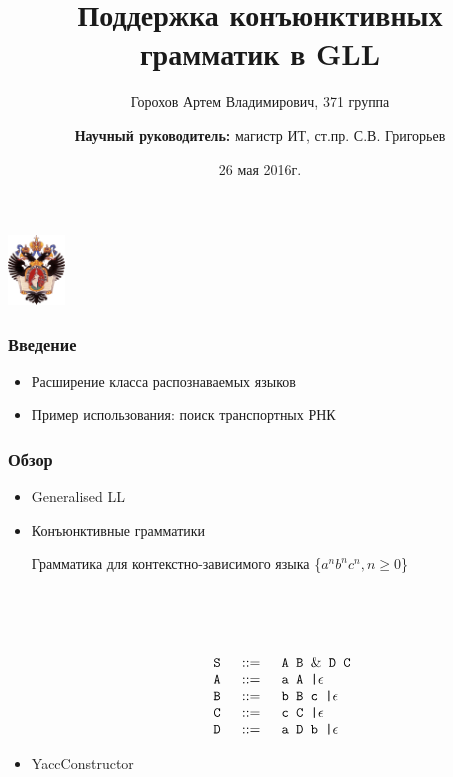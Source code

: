 \documentclass{beamer}
\title[]{Поддержка конъюнктивных грамматик в GLL}
\institute[СПбГУ]{
Санкт-Петербургский государственный университет \\
Кафедра системного программирования }
\author[Горохов Артем]{Горохов Артем Владимирович, 371 группа \\
  \and  
    {\bfseries Научный руководитель:} магистр ИТ, ст.пр. С.В. Григорьев}
\date{26 мая 2016г.}
\begin{document}
{
\begin{frame}
  \begin{center}
  {\includegraphics[width=1.5cm]{courseworkpictures/SPbGU_Logo.png}}
  \end{center}
  \titlepage
\end{frame}
}

\begin{frame}[fragile]
  \transwipe[direction=90]
  \frametitle{Введение}
  \begin{itemize}
    \item Расширение класса распознаваемых языков 
    \item Пример использования: поиск транспортных РНК
  \end{itemize}
\end{frame}
            
\begin{frame}
  \transwipe[direction=90]
  \frametitle{Обзор}
  \begin{itemize}
    \item Generalised LL
    \item Конъюнктивные грамматики \\
        \centerline{Грамматика для контекстно-зависимого языка \{$a^n b^n c^n, n \geq 0$\}} \\
        \\
        \vspace{-10pt}
        \\
        $$
        \begin{array}{crcl}
        & \mbox{\texttt{ S }} &::=& \mbox{\texttt{ A B }} \& \mbox{\texttt{ D C}} \\
        & \mbox{\texttt{ A }} & ::=& \mbox{\texttt{ a A |}}  \epsilon \\
        & \mbox{\texttt{ B }} & ::=& \mbox{\texttt{ b B c |}}  \epsilon \\
        & \mbox{\texttt{ C }} & ::=& \mbox{\texttt{ c C |}}  \epsilon \\
        & \mbox{\texttt{ D }} & ::=& \mbox{\texttt{ a D b |}}\epsilon \\
        \end{array}
        $$
    \item YaccConstructor
  \end{itemize}
\end{frame}
\end{document}
